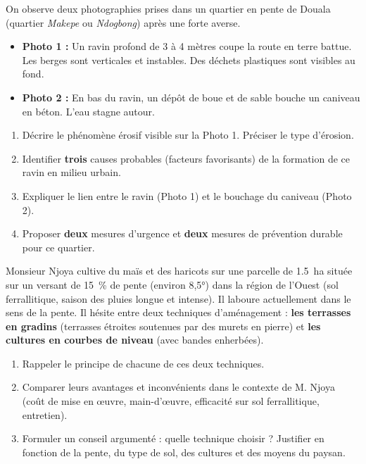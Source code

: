 \documentclass[11pt]{article}
\begin{document}
\begin{exercice}
On observe deux photographies prises dans un quartier en pente de Douala (quartier \emph{Makepe} ou \emph{Ndogbong}) après une forte averse.
\begin{itemize}
    \item \textbf{Photo 1 :} Un ravin profond de 3 à 4 mètres coupe la route en terre battue. Les berges sont verticales et instables. Des déchets plastiques sont visibles au fond.
    \item \textbf{Photo 2 :} En bas du ravin, un dépôt de boue et de sable bouche un caniveau en béton. L'eau stagne autour.
\end{itemize}
\begin{enumerate}
    \item Décrire le phénomène érosif visible sur la Photo 1. Préciser le type d'érosion.
    \item Identifier \textbf{trois} causes probables (facteurs favorisants) de la formation de ce ravin en milieu urbain.
    \item Expliquer le lien entre le ravin (Photo 1) et le bouchage du caniveau (Photo 2).
    \item Proposer \textbf{deux} mesures d'urgence et \textbf{deux} mesures de prévention durable pour ce quartier.
\end{enumerate}
\end{exercice}

\begin{exercice}
Monsieur Njoya cultive du maïs et des haricots sur une parcelle de \SI{1,5}{\hectare} située sur un versant de \SI{15}{\%} de pente (environ 8,5°) dans la région de l'Ouest (sol ferrallitique, saison des pluies longue et intense). Il laboure actuellement dans le sens de la pente. Il hésite entre deux techniques d'aménagement : \textbf{les terrasses en gradins} (terrasses étroites soutenues par des murets en pierre) et \textbf{les cultures en courbes de niveau} (avec bandes enherbées).
\begin{enumerate}
    \item Rappeler le principe de chacune de ces deux techniques.
    \item Comparer leurs avantages et inconvénients dans le contexte de M. Njoya (coût de mise en œuvre, main-d'œuvre, efficacité sur sol ferrallitique, entretien).
    \item Formuler un conseil argumenté : quelle technique choisir ? Justifier en fonction de la pente, du type de sol, des cultures et des moyens du paysan.
\end{enumerate}
\end{exercice}
\end{document}
